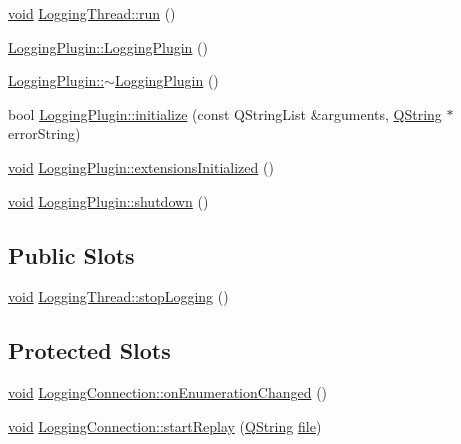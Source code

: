 \begin{DoxyCompactItemize}
\hyperlink{group___u_a_v_objects_plugin_ga444cf2ff3f0ecbe028adce838d373f5c}{void} \hyperlink{group___logging_ga1efde5dc8009a1f63a5ab9a52f9c3749}{\-Logging\-Thread\-::run} ()
\item 
\hyperlink{group___logging_gaddeb416da42e01f34abe18fa2fa39400}{\-Logging\-Plugin\-::\-Logging\-Plugin} ()
\item 
\hyperlink{group___logging_gaea5e4f27d801294d19b75975ce35a567}{\-Logging\-Plugin\-::$\sim$\-Logging\-Plugin} ()
\item 
bool \hyperlink{group___logging_ga35b6ec31ee1c4118f1b15d8fb425e013}{\-Logging\-Plugin\-::initialize} (const \-Q\-String\-List \&arguments, \hyperlink{group___u_a_v_objects_plugin_gab9d252f49c333c94a72f97ce3105a32d}{\-Q\-String} $\ast$error\-String)
\item 
\hyperlink{group___u_a_v_objects_plugin_ga444cf2ff3f0ecbe028adce838d373f5c}{void} \hyperlink{group___logging_gafefd3e10b5da148d3f936cc3631e4792}{\-Logging\-Plugin\-::extensions\-Initialized} ()
\item 
\hyperlink{group___u_a_v_objects_plugin_ga444cf2ff3f0ecbe028adce838d373f5c}{void} \hyperlink{group___logging_ga15f368e20b8953eb38b932e59462c779}{\-Logging\-Plugin\-::shutdown} ()
\end{DoxyCompactItemize}
\subsection*{\-Public \-Slots}
\begin{DoxyCompactItemize}
\item 
\hyperlink{group___u_a_v_objects_plugin_ga444cf2ff3f0ecbe028adce838d373f5c}{void} \hyperlink{group___logging_ga5eba425f2187c79f32c9a7b8187c4de4}{\-Logging\-Thread\-::stop\-Logging} ()
\end{DoxyCompactItemize}
\subsection*{\-Protected \-Slots}
\begin{DoxyCompactItemize}
\item 
\hyperlink{group___u_a_v_objects_plugin_ga444cf2ff3f0ecbe028adce838d373f5c}{void} \hyperlink{group___logging_ga996f0747e733af2177ff669a4311008e}{\-Logging\-Connection\-::on\-Enumeration\-Changed} ()
\item 
\hyperlink{group___u_a_v_objects_plugin_ga444cf2ff3f0ecbe028adce838d373f5c}{void} \hyperlink{group___logging_ga3b3e0a7dac19231ef21518709df897c3}{\-Logging\-Connection\-::start\-Replay} (\hyperlink{group___u_a_v_objects_plugin_gab9d252f49c333c94a72f97ce3105a32d}{\-Q\-String} \hyperlink{uavobjecttemplate_8m_a97c04efa65bcf0928abf9260bc5cbf46}{file})
\end{DoxyCompactItemize}


